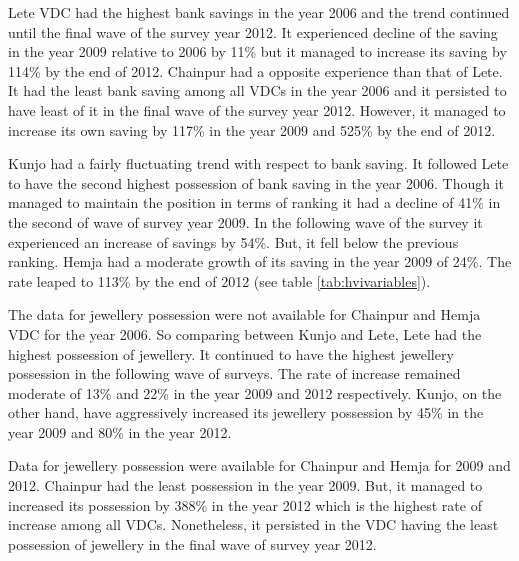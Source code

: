 Lete VDC had the highest bank savings in the year 2006 and the trend continued until the final wave of the survey year 2012. It experienced decline of the saving in the year 2009 relative to 2006 by 11\% but it managed to increase its saving by 114\% by the end of 2012. Chainpur had a opposite experience than that of Lete. It had the least bank saving among all VDCs in the year 2006 and it persisted to have least of it in the final wave of the survey year 2012. However, it managed to increase its own saving by 117\% in the year 2009 and 525\% by the end of 2012.\par 

Kunjo had a fairly fluctuating trend with respect to bank saving. It followed Lete to have the second highest possession of bank saving in the year 2006. Though it managed to maintain the position in terms of ranking it had a decline of 41\% in the second of wave of survey year 2009. In the following wave of the survey it experienced an increase of savings by 54\%. But, it fell below the previous ranking. Hemja had a moderate growth of its saving in the year 2009 of 24\%. The rate leaped to 113\% by the end of 2012 (see table \ref{tab:hvivariables}).\par     

The data for jewellery possession were not available for Chainpur and Hemja VDC for the year 2006. So comparing between Kunjo and Lete, Lete had the highest possession of jewellery. It continued to have the highest jewellery possession in the following wave of surveys. The rate of increase remained moderate of 13\% and 22\% in the year 2009 and 2012 respectively. Kunjo, on the other hand, have aggressively increased its jewellery possession by 45\% in the year 2009 and 80\% in the year 2012.\par 

Data for jewellery possession were available for Chainpur and Hemja for 2009 and 2012. Chainpur had the least possession in the year 2009. But, it managed to increased its possession by 388\% in the year 2012 which is the highest rate of increase among all VDCs. Nonetheless, it persisted in the VDC having the least possession of jewellery in the final wave of survey year 2012.\par

